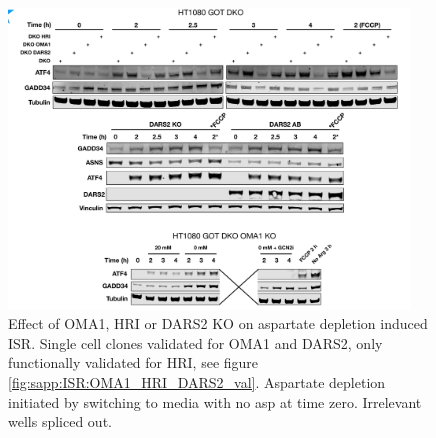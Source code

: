 \begin{figure}[ht]
    \centering
    \includegraphics[width=0.95\textwidth]{figures/sapp/ISR/HT1080_DKO_KO_ISR.pdf}
    \caption[ATF4 post Asp depl. OMA1/HRI KO, western.]{
    Effect of OMA1, HRI or DARS2 KO on aspartate depletion induced ISR.
    Single cell clones validated for OMA1 and DARS2, only functionally validated for HRI, see figure \ref{fig:sapp:ISR:OMA1_HRI_DARS2_val}.
    Aspartate depletion initiated by switching to media with no asp at time zero.
    Irrelevant wells spliced out.
    }
    \label{fig:sapp:ISR:HT1080_DKO_KO_ISR}
\end{figure}

